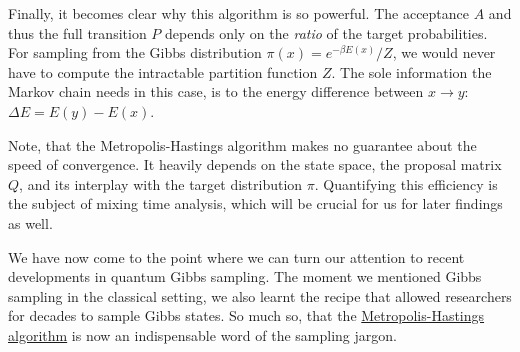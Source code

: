 Finally, it becomes clear why this algorithm is so powerful. The acceptance $A$ and thus the full transition $P$ depends only on the \textit{ratio} of the target probabilities. For sampling from the Gibbs distribution $\pi(x) = e^{-\beta E(x)} / Z$, we would never have to compute the intractable partition function $Z$. The sole information the Markov chain needs in this case, is to the energy difference between $x\rightarrow y$: $\Delta E = E(y) - E(x)$. 

Note, that the Metropolis-Hastings algorithm makes no guarantee about the speed of convergence. It heavily depends on the state space, the proposal  matrix $Q$, and its interplay with the target distribution $\pi$. Quantifying this efficiency is the subject of mixing time analysis, which will be crucial for us for later findings as well. 

We have now come to the point where we can turn our attention to recent developments in quantum Gibbs sampling. The moment we mentioned Gibbs sampling in the classical setting, we also learnt the recipe that allowed researchers for decades to sample Gibbs states. So much so, that the \hyperref[parag:MH]{Metropolis-Hastings algorithm} is now an indispensable word of the sampling jargon. 

\smallskip
